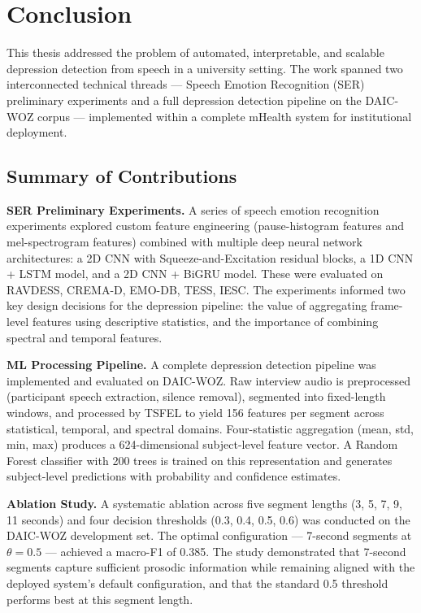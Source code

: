\chapter{Conclusion}
\label{Chapter6}

This thesis addressed the problem of automated, interpretable, and scalable depression detection from speech in a university setting. The work spanned two interconnected technical threads — Speech Emotion Recognition (SER) preliminary experiments and a full depression detection pipeline on the DAIC-WOZ corpus — implemented within a complete mHealth system for institutional deployment.

\section{Summary of Contributions}

\textbf{SER Preliminary Experiments.} A series of speech emotion recognition experiments explored custom feature engineering (pause-histogram features and mel-spectrogram features) combined with multiple deep neural network architectures: a 2D CNN with Squeeze-and-Excitation residual blocks, a 1D CNN + LSTM model, and a 2D CNN + BiGRU model. These were evaluated on RAVDESS, CREMA-D, EMO-DB, TESS, IESC. The experiments informed two key design decisions for the depression pipeline: the value of aggregating frame-level features using descriptive statistics, and the importance of combining spectral and temporal features.

\textbf{ML Processing Pipeline.} A complete depression detection pipeline was implemented and evaluated on DAIC-WOZ. Raw interview audio is preprocessed (participant speech extraction, silence removal), segmented into fixed-length windows, and processed by TSFEL to yield 156 features per segment across statistical, temporal, and spectral domains. Four-statistic aggregation (mean, std, min, max) produces a 624-dimensional subject-level feature vector. A Random Forest classifier with 200 trees is trained on this representation and generates subject-level predictions with probability and confidence estimates.

\textbf{Ablation Study.} A systematic ablation across five segment lengths (3, 5, 7, 9, 11 seconds) and four decision thresholds (0.3, 0.4, 0.5, 0.6) was conducted on the DAIC-WOZ development set. The optimal configuration — 7-second segments at $\theta = 0.5$ — achieved a macro-F1 of 0.385. The study demonstrated that 7-second segments capture sufficient prosodic information while remaining aligned with the deployed system's default configuration, and that the standard 0.5 threshold performs best at this segment length.

